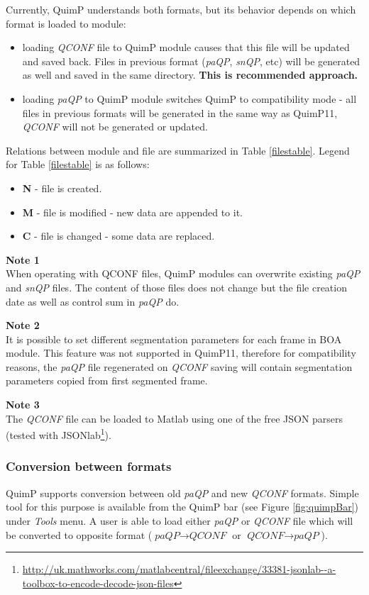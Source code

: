 \documentclass[a4paper,12pt]{article}
\begin{document}
Currently, QuimP understands both formats, but its behavior depends on which format is loaded to module:
\begin{itemize}
	\item loading \textit{QCONF} file to QuimP module causes that this file will be updated and saved back. Files in previous format (\textit{paQP}, \textit{snQP}, etc) will be generated as well and saved in the same directory. \textbf{This is recommended approach.}
	\item loading \textit{paQP} to QuimP module switches QuimP to compatibility mode - all files in previous formats will be generated in the same way as QuimP11, \textit{QCONF} will not be generated or updated. 
\end{itemize}     
Relations between module and file are summarized in Table \ref{filestable}. Legend for Table \ref{filestable} is as follows:
\begin{itemize}
	\item \textbf{N} - file is created.
	\item \textbf{M} - file is modified - new data are appended to it.
	\item \textbf{C} - file is changed - some data are replaced.
\end{itemize}
\textbf{Note 1} \\
When operating with QCONF files, QuimP modules can overwrite existing \textit{paQP} and \textit{snQP} files. The content of those files does not change but the file creation date as well as control sum in \textit{paQP} do.

\textbf{Note 2} \\
It is possible to set different segmentation parameters for each frame in BOA module. This feature was not supported in QuimP11, therefore for compatibility reasons, the \textit{paQP} file regenerated on \textit{QCONF} saving will contain segmentation parameters copied from first segmented frame.

\textbf{Note 3} \\
The \textit{QCONF} file can be loaded to Matlab using one of the free JSON parsers (tested with JSONlab\footnote{\url{http://uk.mathworks.com/matlabcentral/fileexchange/33381-jsonlab--a-toolbox-to-encode-decode-json-files}}).

\subsubsection{Conversion between formats}
QuimP supports conversion between old \textit{paQP} and new \textit{QCONF} formats. Simple tool for this purpose is available from the QuimP bar (see Figure \ref{fig:quimpBar}) under \textit{Tools} menu. A user is able to load either \textit{paQP} or \textit{QCONF} file which will be converted to opposite format ($\textit{paQP} \rightarrow \textit{QCONF}$ or $\textit{QCONF} \rightarrow \textit{paQP}$).
\end{document}
